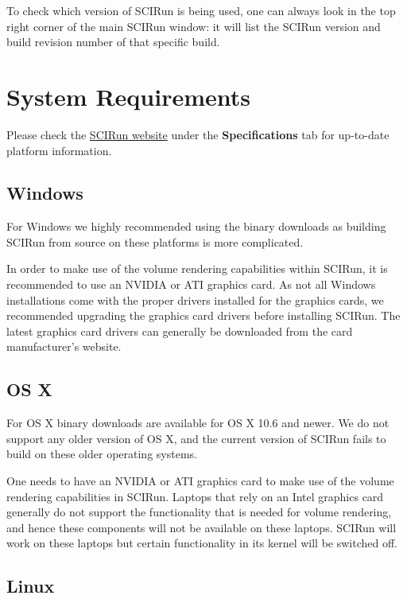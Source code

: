 \documentclass[fleqn,12pt,openany]{book}
\begin{document}
To check which version of SCIRun is being used, one can always look in the top right corner of the main SCIRun window:
it will list the SCIRun version and build revision number of that specific build. 

\section{System Requirements}

Please check the \href{http://www.scirun.org}{SCIRun website} under the \textbf{Specifications} tab for up-to-date platform information.

\subsection{Windows}

For Windows we highly recommended using the binary downloads as building SCIRun from source on these platforms is more complicated.

In order to make use of the volume rendering capabilities within SCIRun, it is recommended to use an NVIDIA or ATI graphics card.
As not all Windows installations come with the proper drivers installed for the graphics cards, we recommended upgrading the graphics card drivers before installing SCIRun.
The latest graphics card drivers can generally be downloaded from the card manufacturer's website.

\subsection{OS X}

For OS X binary downloads are available for OS X 10.6 and newer.
We do not support any older version of OS X, and the current version of SCIRun fails to build on these older operating systems.

One needs to have an NVIDIA or ATI graphics card to make use of the volume rendering capabilities in SCIRun.
Laptops that rely on an Intel graphics card generally do not support the functionality that is needed for volume
rendering, and hence these components will not be available on these laptops.
SCIRun will work on these laptops but certain functionality in its kernel will be switched off. 

\subsection{Linux}
\end{document}
